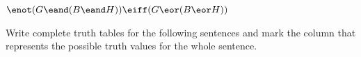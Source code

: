 \begin{compactlist}
\item $\enot(G \eand (B \eand H)) \eiff (G \eor (B \eor H))$
%


\end{compactlist}

\problempart
Write complete truth tables for the following sentences and mark the column that represents the possible truth values for the whole sentence.

